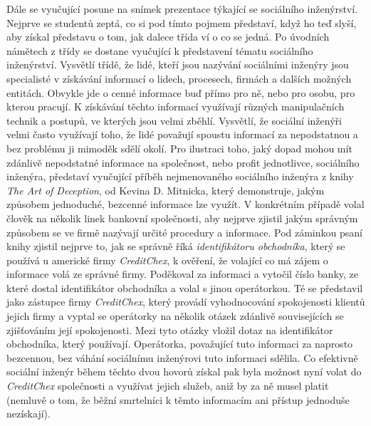 \documentclass[a4paper, 12pt]{article}
\begin{document}
Dále se vyučující posune na snímek prezentace týkající se sociálního inženýrství. Nejprve se studentů zeptá, co si pod tímto pojmem představí, když ho teď slyší, aby získal představu o tom, jak dalece třída ví o co se jedná. Po úvodních námětech z třídy se dostane vyučující k představení tématu sociálního inženýrství. Vysvětlí třídě, že lidé, kteří jsou nazývání sociálními inženýry jsou specialisté v získávání informací o lidech, procesech, firmách a dalších možných entitách. Obvykle jde o cenné informace buď přímo pro ně, nebo pro osobu, pro kterou pracují. K získávání těchto informací využívají různých manipulačních technik a postupů, ve kterých jsou velmi zběhlí. Vysvětlí, že sociální inženýři velmi často využívají toho, že lidé považují spoustu informací za nepodstatnou a bez problému ji mimoděk sdělí okolí. Pro ilustraci toho, jaký dopad mohou mít zdánlivě nepodstatné informace na společnost, nebo profit jednotlivce, sociálního inženýra, představí vyučující příběh nejmenovaného sociálního inženýra z knihy \textit{The Art of Deception}, od Kevina D. Mitnicka, který demonstruje, jakým způsobem jednoduché, bezcenné informace lze využít. V konkrétním případě volal člověk na několik linek bankovní společnosti, aby nejprve zjistil jakým správným způsobem se ve firmě nazývají určité procedury a informace. Pod záminkou psaní knihy zjistil nejprve to, jak se správně říká \textit{identifikátoru obchodníka}, který se používá u americké firmy \textit{CreditChex}, k ověření, že volající co má zájem o informace volá ze správné firmy. Poděkoval za informaci a vytočil číslo banky, ze které dostal identifikátor obchodníka a volal s jinou operátorkou. Té se představil jako zástupce firmy \textit{CreditChex}, který provádí vyhodnocování spokojenosti klientů jejich firmy a vyptal se operátorky na několik otázek zdánlivě souvisejících se zjišťováním její spokojenosti. Mezi tyto otázky vložil dotaz na identifikátor obchodníka, který používají. Operátorka, považující tuto informaci za naprosto bezcennou, bez váhání sociálnímu inženýrovi tuto informaci sdělila. Co efektivně sociální inženýr během těchto dvou hovorů získal pak byla možnost nyní volat do \textit{CreditChex} společnosti a využívat jejich služeb, aniž by za ně musel platit (nemluvě o tom, že běžní smrtelníci k těmto informacím ani přístup jednoduše nezískají).
\end{document}
